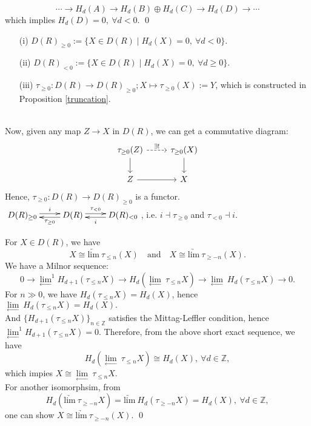 \documentclass[UTF8,12,a4paper]{ctexart}
\theoremstyle{definition}
\begin{document}
$$
\cdots\rightarrow H_d(A)\rightarrow H_d(B)\oplus H_d(C)\rightarrow H_d(D)\rightarrow\cdots
$$ 
which implies $H_d(D)=0,\ \forall d<0.$
\qed
\newline
\newline
\dfn 
\begin{itemize}
	\item [(i)]$D(R)_{\geq 0}:=\{X\in D(R)\mid H_d(X)=0,\ \forall d<0\}.$
	\item [(ii)]$D(R)_{< 0}:=\{X\in D(R)\mid H_d(X)=0,\ \forall d\geq 0\}.$
	\item [(iii)] $\tau_{\geq 0}: D(R)\rightarrow D(R)_{\geq 0}; X\mapsto \tau_{\geq 0}(X):=Y$, which is constructed in Proposition \ref{truncation}.
\end{itemize}
~\\
Now, given any map $Z\rightarrow X$ in $D(R)$, we can get a commutative diagram:
$$
\begin{tikzcd}
\tau_{\geq 0}(Z) \arrow[d] \arrow[r, "\exists !", dashed] & \tau_{\geq 0}(X) \arrow[d] \\
Z \arrow[r]                                               & X                         
\end{tikzcd}
$$
Hence, $\tau_{\geq 0}: D(R)\rightarrow D(R)_{\geq 0}$ is a functor.
\prop 
$\xymatrix{D(R)_{\geq 0} \ar@<0.5ex>[r]^-i
	& D(R)\ar@<0.5ex>[l]^-{\tau_{\geq 0}} \ar@<0.5ex>[r]^-{\tau_{< 0}}
	& D(R)_{<0}\ar@<0.5ex>[l]^-i }$, i.e. $i \dashv \tau_{\geq 0}$ and $\tau_{<0}\dashv i$.

\cor 
For $X\in D(R)$, we have
$$
X\cong \underleftarrow{\text{lim}}\ \tau_{\leq n}(X)\quad\text{and}\quad 
X\cong \underrightarrow{\text{lim}}\ \tau_{\geq -n}(X).
$$
\pf 
We have a Milnor sequence:
$$
0\longrightarrow \underset{\longleftarrow}{\lim}^1 H_{d+1}(\tau_{\leq n}X)\longrightarrow H_d(\underset{\longleftarrow}{\lim}\ \tau_{\leq n}X)\longrightarrow \underset{\longleftarrow}{\lim}\ H_d(\tau_{\leq n}X)\longrightarrow 0.
$$
For $n\gg 0$, we have $H_d(\tau_{\leq n}X)=H_d(X)$, hence $ \underset{\longleftarrow}{\lim}\ H_d(\tau_{\leq n}X)=H_d(X).$ \\
And $\{H_{d+1}(\tau_{\leq n}X)\}_{n\in\mathbb{Z}}$ satisfies the Mittag-Leffler condition, hence $\underset{\longleftarrow}{\lim}^1 H_{d+1}(\tau_{\leq n}X)=0$. Therefore, from the above short exact sequence, we have
$$H_d(\underset{\longleftarrow}{\lim}\ \tau_{\leq n}X)\cong H_d(X),\ \forall d\in\mathbb{Z},$$ 
which impies $X\cong \underset{\longleftarrow}{\lim}\ \tau_{\leq n}X.$ \\
For another isomorphsim, from
$$H_d(\underrightarrow{\text{lim}}\ \tau_{\geq -n}X)
=\underleftarrow{\text{lim}}\ H_d(\tau_{\geq -n}X)=H_d(X),\ \forall d\in\mathbb{Z},
$$
one can show $X\cong \underrightarrow{\text{lim}}\ \tau_{\geq -n}(X).$
\qed
\end{document}
